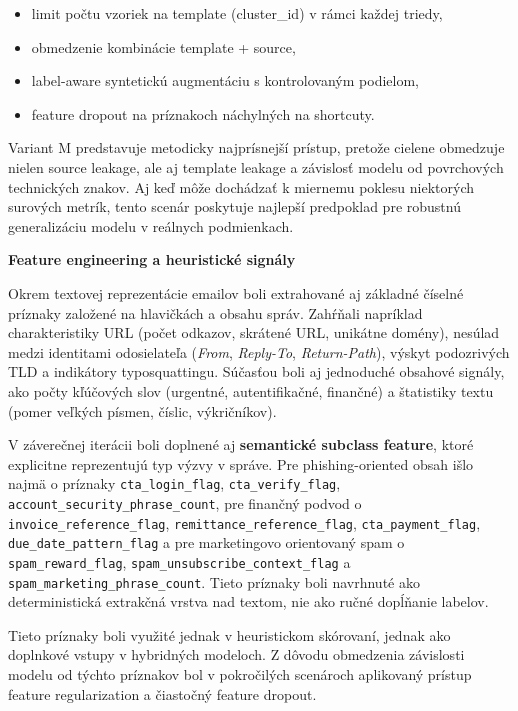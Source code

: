 \documentclass[conference]{IEEEtran}
\begin{document}
\begin{itemize}
    \item limit počtu vzoriek na template (cluster\_id) v rámci každej triedy,
    \item obmedzenie kombinácie template + source,
    \item label-aware syntetickú augmentáciu s kontrolovaným podielom,
    \item feature dropout na príznakoch náchylných na shortcuty.
\end{itemize}

Variant M predstavuje metodicky najprísnejší prístup, pretože cielene obmedzuje nielen source leakage, ale aj template leakage a závislosť modelu od povrchových technických znakov. Aj keď môže dochádzať k miernemu poklesu niektorých surových metrík, tento scenár poskytuje najlepší predpoklad pre robustnú generalizáciu modelu v reálnych podmienkach.

\textbf{Feature engineering a heuristické signály}

Okrem textovej reprezentácie emailov boli extrahované aj základné číselné príznaky založené na hlavičkách a obsahu správ. Zahŕňali napríklad charakteristiky URL (počet odkazov, skrátené URL, unikátne domény), nesúlad medzi identitami odosielateľa (\textit{From}, \textit{Reply-To}, \textit{Return-Path}), výskyt podozrivých TLD a indikátory typosquattingu. Súčasťou boli aj jednoduché obsahové signály, ako počty kľúčových slov (urgentné, autentifikačné, finančné) a štatistiky textu (pomer veľkých písmen, číslic, výkričníkov).

V záverečnej iterácii boli doplnené aj \textbf{semantické subclass feature}, ktoré explicitne reprezentujú typ výzvy v správe. Pre phishing-oriented obsah išlo najmä o príznaky \texttt{cta\_login\_flag}, \texttt{cta\_verify\_flag}, \texttt{account\_security\_phrase\_count}, pre finančný podvod o \texttt{invoice\_reference\_flag}, \texttt{remittance\_reference\_flag}, \texttt{cta\_payment\_flag}, \texttt{due\_date\_pattern\_flag} a pre marketingovo orientovaný spam o \texttt{spam\_reward\_flag}, \texttt{spam\_unsubscribe\_context\_flag} a \texttt{spam\_marketing\_phrase\_count}. Tieto príznaky boli navrhnuté ako deterministická extrakčná vrstva nad textom, nie ako ručné dopĺňanie labelov.

Tieto príznaky boli využité jednak v heuristickom skórovaní, jednak ako doplnkové vstupy v hybridných modeloch. Z dôvodu obmedzenia závislosti modelu od týchto príznakov bol v pokročilých scenároch aplikovaný prístup feature regularization a čiastočný feature dropout.
\end{document}
